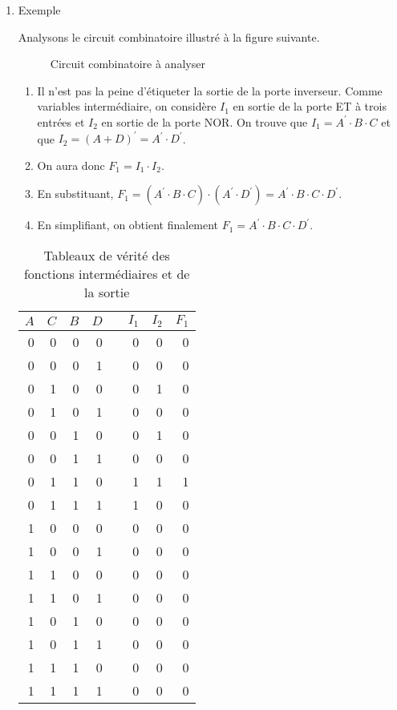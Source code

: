 \documentclass[letter, oneside]{book}
\begin{document}
\begin{enumerate}
\item Exemple
\label{sec:org4602e61}

Analysons le circuit combinatoire illustré à la figure
suivante.

\begin{figure}[htbp]
\centering

\caption{\label{fig:orge055825}Circuit combinatoire à analyser}
\end{figure}

\begin{enumerate}
\item Il n'est pas la peine d'étiqueter la sortie de la porte
inverseur. Comme variables intermédiaire, on considère \(I_1\) en
sortie de la porte ET à trois entrées et \(I_2\) en sortie de la
porte NOR. On trouve que \(I_1 = A^\prime \cdot B \cdot C\) et que
\(I_2 = (A + D)^\prime = A^\prime \cdot D^\prime\).

\item On aura donc \(F_1 = I_1 \cdot I_2\).

\item En substituant, \(F_1 = ( A^\prime \cdot B \cdot C ) \cdot (
   A^\prime \cdot D^\prime) = A^\prime \cdot B \cdot C \cdot
   D^\prime\).

\item En simplifiant, on obtient finalement \(F_1 = A^\prime \cdot B
   \cdot C \cdot D^\prime\).
\end{enumerate}

\begin{table}[htbp]
\caption{\label{tab:org4a67d68}Tableaux de vérité des fonctions intermédiaires et de la sortie}
\centering
\begin{tabular}{rrrrlrrr}
\(A\) & \(C\) & \(B\) & \(D\) &  & \(I_1\) & \(I_2\) & \(F_1\)\\[0pt]
\hline
0 & 0 & 0 & 0 &  & 0 & 0 & 0\\[0pt]
0 & 0 & 0 & 1 &  & 0 & 0 & 0\\[0pt]
0 & 1 & 0 & 0 &  & 0 & 1 & 0\\[0pt]
0 & 1 & 0 & 1 &  & 0 & 0 & 0\\[0pt]
0 & 0 & 1 & 0 &  & 0 & 1 & 0\\[0pt]
0 & 0 & 1 & 1 &  & 0 & 0 & 0\\[0pt]
0 & 1 & 1 & 0 &  & 1 & 1 & 1\\[0pt]
0 & 1 & 1 & 1 &  & 1 & 0 & 0\\[0pt]
1 & 0 & 0 & 0 &  & 0 & 0 & 0\\[0pt]
1 & 0 & 0 & 1 &  & 0 & 0 & 0\\[0pt]
1 & 1 & 0 & 0 &  & 0 & 0 & 0\\[0pt]
1 & 1 & 0 & 1 &  & 0 & 0 & 0\\[0pt]
1 & 0 & 1 & 0 &  & 0 & 0 & 0\\[0pt]
1 & 0 & 1 & 1 &  & 0 & 0 & 0\\[0pt]
1 & 1 & 1 & 0 &  & 0 & 0 & 0\\[0pt]
1 & 1 & 1 & 1 &  & 0 & 0 & 0\\[0pt]
\end{tabular}
\end{table}
\end{enumerate}
\end{document}
